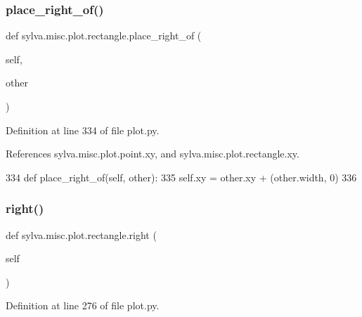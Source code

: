 \subsubsection{\texorpdfstring{place\+\_\+right\+\_\+of()}{place\_right\_of()}}
{\footnotesize\ttfamily def sylva.\+misc.\+plot.\+rectangle.\+place\+\_\+right\+\_\+of (\begin{DoxyParamCaption}\item[{}]{self,  }\item[{}]{other }\end{DoxyParamCaption})}



Definition at line 334 of file plot.\+py.



References sylva.\+misc.\+plot.\+point.\+xy, and sylva.\+misc.\+plot.\+rectangle.\+xy.


\begin{DoxyCode}
334         \textcolor{keyword}{def }place\_right\_of(self, other):
335             self.xy = other.xy + (other.width, 0)
336 
\end{DoxyCode}
\mbox{\label{classsylva_1_1misc_1_1plot_1_1rectangle_a50bdb9a7a95b6e03a66ce8031649ff9f}} 
\subsubsection{\texorpdfstring{right()}{right()}}
{\footnotesize\ttfamily def sylva.\+misc.\+plot.\+rectangle.\+right (\begin{DoxyParamCaption}\item[{}]{self }\end{DoxyParamCaption})}



Definition at line 276 of file plot.\+py.



